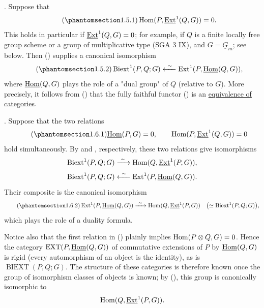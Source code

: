 . Suppose that
\begin{equation}\tag{\SGARefTarget{sga7.sga7i.eviii.n1-5-1}{1.5.1}}
 \Hom(P,\uExt^1(Q,G))=0.
\end{equation}
This holds in particular if $\uExt^1(Q,G)=0$; for example, if $Q$ is
a finite locally free group scheme or a group of multiplicative type
(SGA 3 IX), and $G=\underline G_m$; see  below.  Then ()
supplies a canonical isomorphism
\begin{equation}\tag{\SGARefTarget{sga7.sga7i.eviii.n1-5-2}{1.5.2}}
 \Biext^1(P,Q;G)
 \xleftarrow{\ \sim\ }
 \Ext^1(P,\uHom(Q,G)),
\end{equation}
where $\uHom(Q,G)$ plays the role of a "dual group" of $Q$ (relative
to $G$).  More precisely, it follows from () that the fully
faithful functor () is an \underline{equivalence of categories}.

. Suppose that the two relations
\begin{equation}\tag{\SGARefTarget{sga7.sga7i.eviii.n1-6-1}{1.6.1}}
 \uHom(P,G)=0,\qquad
 \Hom(P,\uExt^1(Q,G))=0
\end{equation}
hold simultaneously.  By  and , respectively, these two
relations give isomorphisms
\[
 \Biext^1(P,Q;G)
 \xrightarrow{\ \sim\ }
 \Hom(Q,\uExt^1(P,G)),
\]
\[
 \Biext^1(P,Q;G)
 \xleftarrow{\ \sim\ }
 \Ext^1(P,\uHom(Q,G)).
\]
Their composite is the canonical isomorphism
\begin{equation}\tag{\SGARefTarget{sga7.sga7i.eviii.n1-6-2}{1.6.2}}
 \Ext^1(P,\uHom(Q,G))
 \xrightarrow{\ \sim\ }
 \Hom(Q,\uExt^1(P,G))
 \quad\bigl(\simeq\Biext^1(P,Q;G)\bigr),
\end{equation}
which plays the role of a duality formula.

Notice also that the first relation in () plainly implies
$\operatorname{Hom}(P\otimes Q,G)=0$.  Hence the category
$\operatorname{EXT}(P,\uHom(Q,G))$ of commutative extensions of $P$
by $\uHom(Q,G)$ is rigid (every automorphism of an object is the
identity), as is $\operatorname{BIEXT}(P,Q;G)$.  The structure of
these categories is therefore known once the group of isomorphism
classes of objects is known; by (), this group is canonically
isomorphic to
\[
 \Hom(Q,\uExt^1(P,G)).
\]

